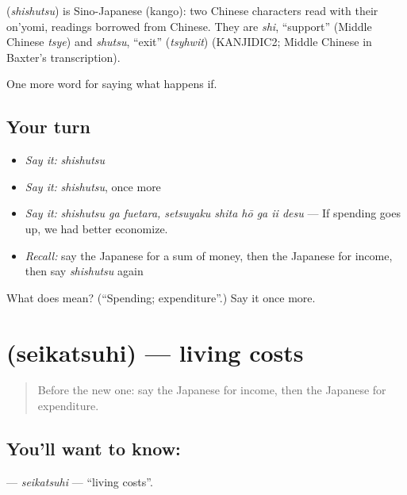\begin{cousinweb}
\textbf{} (\emph{shishutsu}) is Sino-Japanese (kango): two Chinese characters read with their on'yomi, readings borrowed from Chinese. They are \emph{shi}, \textquotedblleft{}support\textquotedblright{} (Middle Chinese \emph{tsye}) and \emph{shutsu}, \textquotedblleft{}exit\textquotedblright{} (\emph{tsyhwit}) (KANJIDIC2; Middle Chinese in Baxter's transcription).
\end{cousinweb}

\begin{grammarlens}[title={What you've built}]
One more word for saying what happens if.
\end{grammarlens}

\subsection*{Your turn}
\begin{itemize}
\raggedright
  \item \emph{Say it:} \emph{shishutsu}
  \item \emph{Say it:} \emph{shishutsu}, once more
  \item \emph{Say it:} \emph{shishutsu ga fuetara, setsuyaku shita hō ga ii desu} — If spending goes up, we had better economize.
  \item \emph{Recall:} say the Japanese for a sum of money, then the Japanese for income, then say \emph{shishutsu} again
\end{itemize}

\begin{tcolorbox}[breakable,colback=teal!4,colframe=teal!35!black,title={Before you move on}]
What does  mean? (\textquotedblleft{}Spending; expenditure\textquotedblright{}.) Say it once more.
\end{tcolorbox}
\section[\texorpdfstring{\ja{せいかつひ} (seikatsuhi)}{せいかつひ (seikatsuhi)}]{ (seikatsuhi) — living costs}

\label{lesson:JA-C360-seikatsuhi}



\begin{quote}
Before the new one: say the Japanese for income, then the Japanese for expenditure.
\end{quote}

\subsection*{You'll want to know: }
\textbf{} — \emph{seikatsuhi} — \textquotedblleft{}living costs\textquotedblright{}.

